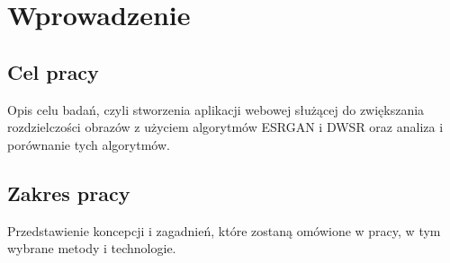 \chapter{Wprowadzenie}
\section{Cel pracy}
Opis celu badań, czyli stworzenia aplikacji webowej służącej do zwiększania rozdzielczości obrazów z użyciem algorytmów ESRGAN i DWSR oraz analiza i porównanie tych algorytmów.
\section{Zakres pracy}
Przedstawienie koncepcji i zagadnień, które zostaną omówione w pracy, w tym wybrane metody i technologie.